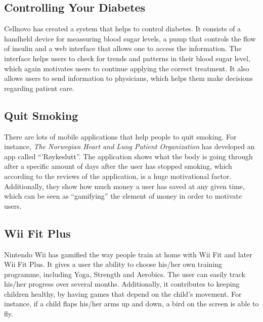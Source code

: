 \subsection{Controlling Your Diabetes}
Cellnovo has created a system that helps to control diabetes. It consists of a handheld device for meassuring blood sugar levels, a pump that controls the flow of insulin and a web interface that allows one to access the information. The interface helps users to check for trends and patterns in their blood sugar level, which again motivates users to continue applying the correct treatment. It also allows users to send information to physicians, which helps them make decisions regarding patient care.
      


\subsection{Quit Smoking}
There are lots of mobile applications that help people to quit smoking. For instance, \emph{The Norwegian Heart and Lung Patient Organization} has developed an app called ``'R\o ykeslutt''. The application shows what the body is going through after a specific amount of days after the user has stopped smoking, which according to the reviews of the application, is a huge motivational factor. Additionally, they show how much money a user has saved at any given time, which can be seen as ``gamifying'' the element of money in order to motivate users.  


\subsection{Wii Fit Plus}
Nintendo Wii has gamified the way people train at home with Wii Fit and later Wii Fit Plus. It gives a user the ability to choose his/her own training programme, including Yoga, Strength and Aerobics. The user can easily track his/her progress over several months. Additionally, it contributes to keeping children healthy, by having games that depend on the child's movement. For instance, if a child flaps his/her arms up and down, a bird on the screen is able to fly.    
 